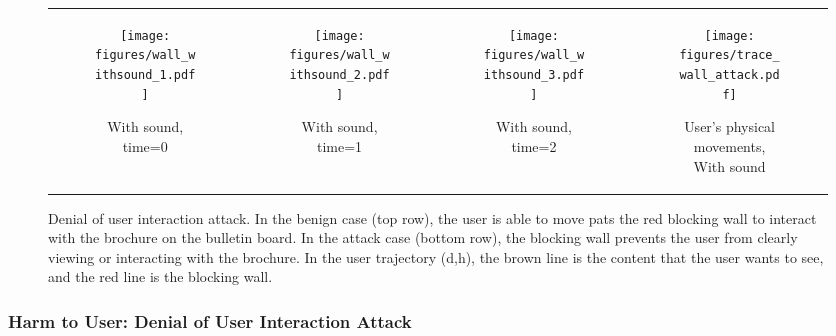 \begin{figure*}
\begin{tabular}{cccc}
        \begin{subfigure}[b]{0.22\textwidth}
            \centering
            \texttt{[image: figures/wall\_withsound\_1.pdf]}
            \caption{With sound, time=0}
            \label{subfig:wall_withsound_frame1}
        \end{subfigure} &
        \begin{subfigure}[b]{0.22\textwidth}
            \centering
            \texttt{[image: figures/wall\_withsound\_2.pdf]}
            \caption{With sound, time=1}
            \label{subfig:wall_withsound_frame2}
        \end{subfigure} &
        \begin{subfigure}[b]{0.22\textwidth}
            \centering
            \texttt{[image: figures/wall\_withsound\_3.pdf]}
            \caption{With sound, time=2}
            \label{subfig:wall_withsound_frame3}
        \end{subfigure} &
        \begin{subfigure}[b]{0.24\textwidth}
            \centering
            \texttt{[image: figures/trace\_wall\_attack.pdf]}
            \caption{User's physical movements, With sound}
            \label{subfig:trace_wall_attack}
        \end{subfigure}
    \end{tabular}
    \caption{Denial of user interaction attack. 
    In the benign case (top row), the user is able to move pats the red blocking wall to interact with the brochure on the bulletin board.
    In the attack case (bottom row), the blocking wall prevents the user from clearly viewing or interacting with the brochure.
    In the user trajectory (d,h), the brown line is the content that the user wants to see, and the red line is the blocking wall.
   }
    \label{fig:wall}
\end{figure*}



\subsubsection{Harm to User: Denial of User Interaction Attack}
\label{sec:app_blocking_wall}


